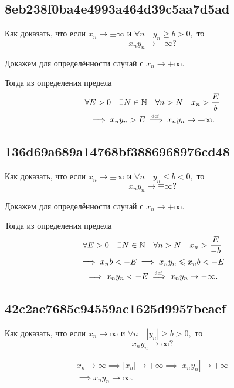 \documentclass[11pt, a5paper]{article}
\newenvironment{note}[1]{\goodbreak\par\subsection{\hfill \color{lightgray}\tiny #1}}{}
\newenvironment{cloze}[2][\ldots]{\begin{leftbar}}{\end{leftbar}}
\begin{document}
    \begin{note}{8eb238f0ba4e4993a464d39c5aa7d5ad}
		Как доказать, что если \( x_n \to \pm \infty  \) и \( \forall n \quad y_n \geqslant b > 0,  \) то \[
            x_n y_n \to \pm \infty?
		\]

        \begin{cloze}{1}
            Докажем для определённости случай с \( x_n \to +\infty. \)

            Тогда из определения предела
            \begin{multline*}
                \forall E > 0 \quad \exists N \in \mathbb N \quad \forall n > N \quad x_n > \frac{E}{b} \\
                \implies x_n y_n > E \overset{\!\!\text{\tiny def}}\implies x_n y_n \to +\infty.
            \end{multline*}
        \end{cloze}
    \end{note}

    \begin{note}{136d69a689a14768bf3886968976cd48}
		Как доказать, что если \( x_n \to \pm \infty  \) и \( \forall n \quad y_n \leqslant b < 0,  \) то \[
            x_n y_n \to \mp \infty?
		\]

        \begin{cloze}{1}
            Докажем для определённости случай с \( x_n \to +\infty. \)

            Тогда из определения предела
            \begin{multline*}
                \forall E > 0 \quad \exists N \in \mathbb N \quad \forall n > N \quad x_n > \frac{E}{-b} \\
                \implies x_n b < -E \implies x_n y_n \leqslant x_n b < -E \\
                \implies x_n y_n < -E \overset{\!\!\text{\tiny def}}\implies x_n y_n \to -\infty.
            \end{multline*}
        \end{cloze}
    \end{note}

    \begin{note}{42c2ae7685c94559ac1625d9957beaef}
		Как доказать, что если \( x_n \to \infty  \) и \( \forall n \quad |y_n| \geqslant b > 0,  \) то \[
            x_n y_n \to \infty?
		\]

        \begin{cloze}{1}
            \begin{multline*}
                x_n \to \infty \implies |x_n| \to +\infty \implies |x_n y_n| \to +\infty \\
                \implies x_n y_n \to \infty.
            \end{multline*}
        \end{cloze}
    \end{note}
\end{document}

